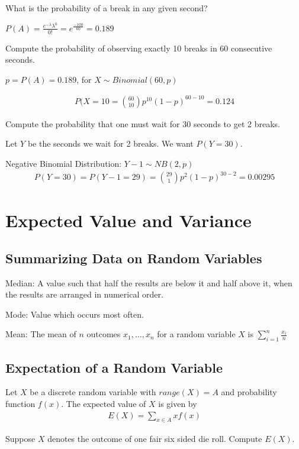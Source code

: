 \documentclass{article}
\begin{document}
What is the probability of a break in any given second?

$P(A) = \frac{e^{-\lambda}\lambda^0}{0!}=e^{\frac{-100}{60}} = 0.189$

Compute the probability of observing exactly 10 breaks in 60 consecutive seconds.

$p = P(A) = 0.189$, for $X \sim Binomial(60,p)$


\begin{align*}
    P(X=10 = \binom{60}{10}p^{10}(1-p)^{60-10} = 0.124
\end{align*}

Compute the probability that one must wait for 30 seconds to get 2 breaks.

Let $Y$ be the seconds we wait for 2 breaks. We want $P(Y=30)$.

Negative Binomial Distribution: $Y - 1 \sim NB(2,p)$
\begin{align*}
    P(Y=30) = P(Y - 1 = 29) = \binom{29}{1}p^2(1-p)^{30-2} = 0.00295
\end{align*}

\section{Expected Value and Variance}

\subsection{Summarizing Data on Random Variables}

Median: A value such that half the results are below it and half above it, when the results are arranged in numerical order.

Mode: Value which occurs most often.

Mean: The mean of $n$ outcomes $x_1, \ldots, x_n$ for a random variable $X$ is $\sum_{i=1}^n\frac{x_i}{n}$


\subsection{Expectation of a Random Variable}

Let $X$ be a discrete random variable with $range(X) = A$ and probability function $f(x)$. The expected value of $X$ is given by
\begin{align*}
    E(X) = \sum_{x \in A}xf(x)
\end{align*}

Suppose $X$ denotes the outcome of one fair six sided die roll. Compute $E(X)$.
\end{document}
